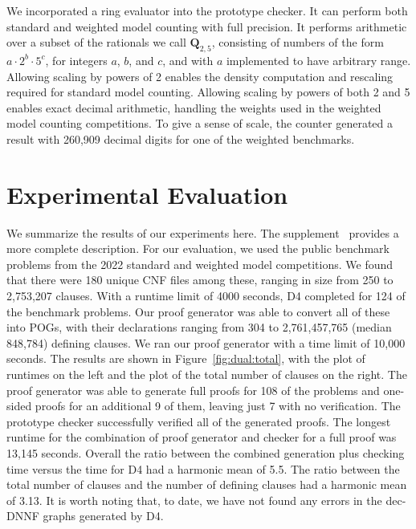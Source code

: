 \documentclass[letterpaper,USenglish,cleveref, autoref, thm-restate]{lipics-v2021}
\newcommand{\drational}{\textbf{Q}_{2,5}}
\newcommand{\progname}[1]{\textsc{#1}}
\newcommand{\dfour}{\progname{D4}}
\begin{document}
We incorporated a ring evaluator into the prototype checker.  It
can perform both standard and weighted
model counting with full precision.  It performs arithmetic over a subset of the rationals
we call $\drational$, consisting of numbers of the form $a \cdot 2^{b}
\cdot 5^{c}$, for integers $a$, $b$, and $c$, and with $a$ implemented
to have arbitrary range.  Allowing scaling by powers of 2 enables the
density computation and rescaling required for standard model
counting.  Allowing scaling by powers of both 2 and 5 enables exact
decimal arithmetic, handling the weights used in the weighted model
counting competitions.  To give a sense of scale, the counter
generated a result with 260,909 decimal digits
for one of the weighted benchmarks.


\section{Experimental Evaluation}
\label{sect:experimental}



We summarize the results of our experiments here.  
The supplement~\cite{bryant:sat:2023:supplement}
provides a more complete description. For our
evaluation, we used the public benchmark problems from the 2022
standard and weighted model competitions.  We found that there were
180 unique CNF files among these, ranging in size from 250 to
2,753,207 clauses.
With a runtime limit of 4000 seconds, \dfour{} completed for 124 of the
benchmark problems.  Our proof generator was able to convert all of
these into POGs, with their declarations ranging from 304 to
2,761,457,765 (median 848,784) defining clauses.
We ran our proof generator with a time limit of 10,000 seconds.
The results are shown in Figure~\ref{fig:dual:total}, with the plot of runtimes on the left and the plot of the total number of clauses on the right.
The proof generator was able to generate full proofs for 108 of the problems and
one-sided proofs for an additional 9 of them, leaving just 7 with no
verification.  The prototype checker successfully verified all of the generated
proofs.  The longest runtime for the combination of proof generator
and checker for a full proof was 13,145 seconds.
Overall the ratio
between the combined generation plus checking time versus the time
for \dfour{} had a harmonic mean of 5.5.
The ratio between the total number of clauses and the number of defining clauses had a harmonic mean of 3.13.
It is worth noting that, to date, we have not found
any errors in the dec-DNNF graphs generated by \dfour{}.
\end{document}
